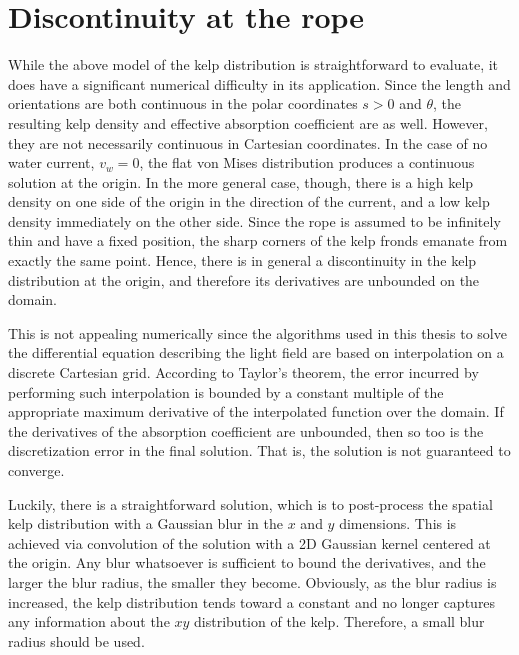 \section{Discontinuity at the rope}
While the above model of the kelp distribution is straightforward to evaluate, it does have a significant numerical difficulty in its application.
Since the length and orientations are both continuous in the polar coordinates $s>0$ and $\theta$, the resulting kelp density and effective absorption coefficient are as well.
However, they are not necessarily continuous in Cartesian coordinates.
In the case of no water current, $v_w=0$, the flat von Mises distribution produces a continuous solution at the origin.
In the more general case, though, there is a high kelp density on one side of the origin in the direction of the current, and a low kelp density immediately on the other side.
Since the rope is assumed to be infinitely thin and have a fixed position, the sharp corners of the kelp fronds emanate from exactly the same point.
Hence, there is in general a discontinuity in the kelp distribution at the origin, and therefore its derivatives are unbounded on the domain.

This is not appealing numerically since the algorithms used in this thesis to solve the differential equation describing the light field are based on interpolation on a discrete Cartesian grid.
According to Taylor's theorem, the error incurred by performing such interpolation is bounded by a constant multiple of the appropriate maximum derivative of the interpolated function over the domain.
If the derivatives of the absorption coefficient are unbounded, then so too is the discretization error in the final solution.
That is, the solution is not guaranteed to converge.

Luckily, there is a straightforward solution, which is to post-process the spatial kelp distribution with a Gaussian blur in the $x$ and $y$ dimensions.
This is achieved via convolution of the solution with a 2D Gaussian kernel centered at the origin.
Any blur whatsoever is sufficient to bound the derivatives, and the larger the blur radius, the smaller they become.
Obviously, as the blur radius is increased, the kelp distribution tends toward a constant and no longer captures any information about the $xy$ distribution of the kelp.
Therefore, a small blur radius should be used.

